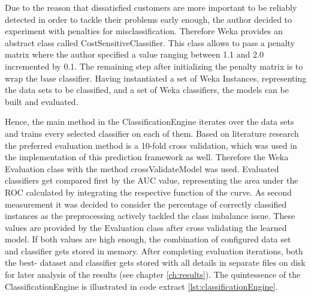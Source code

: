 Due to the reason that dissatisfied customers are more important to be reliably detected in order to tackle their problems early enough, the author decided to experiment with penalties for misclassification. Therefore Weka provides an abstract class called CostSensitiveClassifier. This class allows to pass a penalty matrix where the author specified a value ranging between 1.1 and 2.0 incremented by 0.1. The remaining step after initializing the penalty matrix is to wrap the base classifier. Having instantiated a set of Weka Instances, representing the data sets to be classified, and a set of Weka classifiers, the models can be built and evaluated. 

Hence, the main method in the ClassificationEngine iterates over the data sets and trains every selected classifier on each of them. Based on literature research the preferred evaluation method is a 10-fold cross validation, which was used in the implementation of this prediction framework as well. Therefore the Weka Evaluation class with the method crossValidateModel was used. Evaluated classifiers get compared first by the AUC value, representing the area under the ROC calculated by integrating the respective function of the curve. As second measurement it was decided to consider the percentage of correctly classified instances as the preprocessing actively tackled the class imbalance issue. These values are provided by the Evaluation class after cross validating the learned model. If both values are high enough, the combination of configured data set and classifier gets stored in memory. After completing evaluation iterations, both the best- dataset and classifier gets stored with all details in separate files on disk for later analysis of the results (see chapter \ref{ch:results}). The quintessence of the ClassificationEngine is illustrated in code extract \ref{lst:classificationEngine}. 

